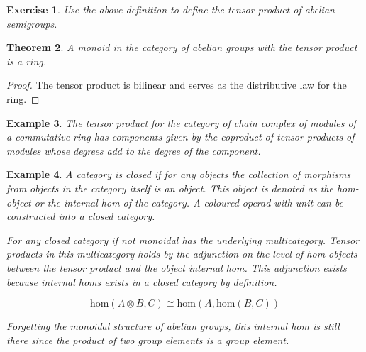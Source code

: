 \documentclass{tufte-book}
\newtheorem{theorem}{Theorem}
\newtheorem{example}[theorem]{Example}
\newtheorem{exercise}[theorem]{Exercise}
\begin{document}
\begin{exercise}
  Use the above definition to define the tensor product of abelian semigroups.
\end{exercise}

\begin{theorem}
  A monoid in the category of abelian groups with the tensor product is a ring.
\end{theorem}

\begin{proof}
  The tensor product is bilinear and serves as the distributive law for the ring.
\end{proof}

\begin{example}
  The tensor product for the category of chain complex of modules of a commutative ring has components given by the coproduct of tensor products of modules whose degrees add to the degree of the component.
\end{example}

\begin{example}
  A category is closed if for any objects the collection of morphisms from objects in the category itself is an object. This object is denoted as the hom-object or the internal hom of the category. A coloured operad with unit can be constructed into a closed category.

  For any closed category if not monoidal has the underlying multicategory. Tensor products in this multicategory holds by the adjunction on the level of hom-objects between the tensor product and the object internal hom. This adjunction exists because internal homs exists in a closed category by definition.
  
  \begin{equation}
    \mathrm{hom}(A \otimes B, C)
    \cong
    \mathrm{hom}(A, \mathrm{hom}(B,C))
  \end{equation}

  Forgetting the monoidal structure of abelian groups, this internal hom is still there since the product of two group elements is a group element.
\end{example}
\end{document}
